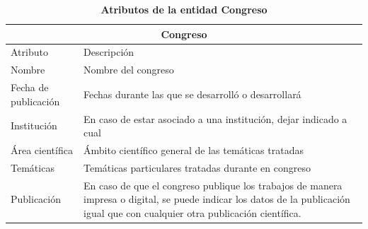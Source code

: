 \begin{table}[!h]
	\centering	
	\caption{\textbf{Atributos de la entidad Congreso}}
	\begin{tabularx}{0.9\linewidth}{lX}
		\toprule
		\multicolumn{2}{c}{\textbf{Congreso}}\\
		\midrule
		Atributo&Descripción\\
		\midrule
		Nombre&Nombre del congreso\\
		Fecha de publicación&Fechas durante las que se desarrolló o desarrollará\\
		Institución&En caso de estar asociado a una institución, dejar indicado a cual\\
		Área científica&Ámbito científico general de las temáticas tratadas\\
		Temáticas&Temáticas particulares tratadas durante en congreso\\
		Publicación&En caso de que el congreso publique los trabajos de manera impresa o digital, se puede indicar los datos de la publicación igual que con cualquier otra publicación científica.\\
		
		\bottomrule
	\end{tabularx}
	
	\label{tab:congreso}
\end{table}%
